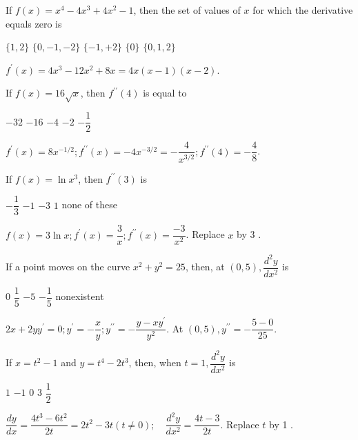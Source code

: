 \question
If $f(x)=x^{4}-4 x^{3}+4 x^{2}-1$, then the set of values of $x$ for which the derivative equals zero is
\begin{choices}
  \choice $\{1,2\}$
  \choice $\{0,-1,-2\}$
  \choice $\{-1,+2\}$
  \choice $\{0\}$
  \CorrectChoice $\{0,1,2\}$
\end{choices}
\begin{solution}
$f^{\prime}(x)=4 x^{3}-12 x^{2}+8 x=4 x(x-1)(x-2)$.
\end{solution}




\newpage



\question
If $f(x)=16 \sqrt{x}$, then $f^{\prime \prime}(4)$ is equal to
\begin{choices}
  \choice $-32$
  \choice $-16$
  \choice $-4$
  \choice $-2$
  \CorrectChoice $-\dfrac{1}{2}$
\end{choices}
\begin{solution}
$f^{\prime}(x)=8 x^{-1 / 2} ; f^{\prime \prime}(x)=-4 x^{-3 / 2}=-\dfrac{4}{x^{3 / 2}} ; f^{\prime \prime}(4)=-\dfrac{4}{8}$.
\end{solution}

\question
If $f(x)=\ln x^{3}$, then $f^{\prime \prime}(3)$ is
\begin{choices}
  \CorrectChoice $-\dfrac{1}{3}$
  \choice $-1$
  \choice $-3$
  \choice $1$
  \choice none of these
\end{choices}
\begin{solution}
$f(x)=3 \ln x ; f^{\prime}(x)=\dfrac{3}{x} ; f^{\prime \prime}(x)=\dfrac{-3}{x^{2}}$. Replace $x$ by 3 .
\end{solution}

\question
If a point moves on the curve $x^{2}+y^{2}=25$, then, at $(0,5), \dfrac{d^{2} y}{d x^{2}}$ is
\begin{choices}
  \choice $0$
  \choice $\dfrac{1}{5}$
  \choice $-5$
  \CorrectChoice $-\dfrac{1}{5}$
  \choice nonexistent
\end{choices}
\begin{solution}
$2 x+2 y y^{\prime}=0 ; y^{\prime}=-\dfrac{x}{y} ; y^{\prime \prime}=-\dfrac{y-x y^{\prime}}{y^{2}}$. At $(0,5), y^{\prime \prime}=-\dfrac{5-0}{25}$.
\end{solution}




\newpage



\question
If $x=t^{2}-1$ and $y=t^{4}-2 t^{3}$, then, when $t=1, \dfrac{d^{2} y}{d x^{2}}$ is
\begin{choices}
  \choice $1$
  \choice $-1$
  \choice $0$
  \choice $3$
  \CorrectChoice $\dfrac{1}{2}$
\end{choices}
\begin{solution}
$\dfrac{d y}{d x}=\dfrac{4 t^{3}-6 t^{2}}{2 t}=2 t^{2}-3 t(t \neq 0) ; \quad \dfrac{d^{2} y}{d x^{2}}=\dfrac{4 t-3}{2 t}$. Replace $t$ by 1 .
\end{solution}

